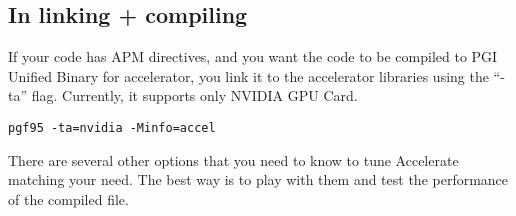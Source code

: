 \subsection{In linking + compiling}
\label{sec:linking-+-compiling}

If your code has APM directives, and you want the code to be compiled
to PGI Unified Binary for accelerator, you link it to the accelerator
libraries using the ``-ta'' flag. Currently, it supports only NVIDIA
GPU Card.

\begin{lstlisting}
pgf95 -ta=nvidia -Minfo=accel
\end{lstlisting}

There are several other options that you need to know to tune
Accelerate matching your need.  The best way is to play with them and
test the performance of the compiled file.
